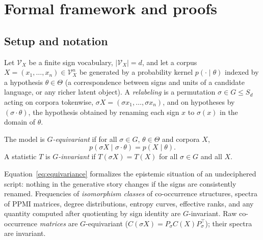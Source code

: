 
\newcommand{\Vx}{\mathcal{V}_X}
\newcommand{\Orb}{\mathrm{Orb}}
\newcommand{\eff}{\mathrm{eff}}

\section{Formal framework and proofs}
\label{app:proofs}

\subsection{Setup and notation}
\label{app:setup}

Let $\Vx$ be a finite sign vocabulary, $|\Vx|=d$, and let a corpus
$X=(x_1,\dots,x_n)\in\Vx^{n}$ be generated by a probability kernel
$p(\cdot\mid\theta)$ indexed by a hypothesis $\theta\in\Theta$ (a
correspondence between signs and units of a candidate language, or any
richer latent object). A \emph{relabeling} is a permutation
$\sigma\in G\le S_{d}$ acting on corpora tokenwise,
$\sigma X=(\sigma x_1,\dots,\sigma x_n)$, and on hypotheses by
$(\sigma\cdot\theta)$, the hypothesis obtained by renaming each sign
$x$ to $\sigma(x)$ in the domain of $\theta$.

\begin{definition}
\label{def:equivariance}
The model is \emph{$G$-equivariant} if for all $\sigma\in G$,
$\theta\in\Theta$ and corpora $X$,
\begin{equation}
p(\sigma X\mid \sigma\cdot\theta)=p(X\mid\theta).
\label{eq:equivariance}
\end{equation}
A statistic $T$ is \emph{$G$-invariant} if $T(\sigma X)=T(X)$ for all
$\sigma\in G$ and all $X$.
\end{definition}

Equation~\eqref{eq:equivariance} formalizes the epistemic situation of
an undeciphered script: nothing in the generative story changes if the
signs are consistently renamed. Frequencies of \emph{isomorphism
classes} of co-occurrence structures, spectra of PPMI matrices, degree
distributions, entropy curves, effective ranks, and any quantity
computed after quotienting by sign identity are $G$-invariant.
Raw co-occurrence \emph{matrices} are $G$-equivariant
($C(\sigma X)=P_\sigma C(X)P_\sigma^{\top}$); their spectra are
invariant.


